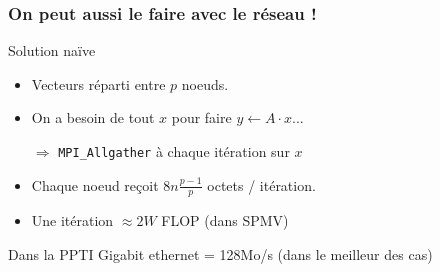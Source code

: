 \documentclass[xcolor={x11names,svgnames}, 14pt]{beamer}
\begin{document}
\begin{frame}
  \frametitle{On peut aussi le faire avec le réseau !}

  \begin{block}{Solution naïve}
    \begin{itemize}
    \item Vecteurs réparti entre $p$ noeuds.
    \item On a besoin de tout $x$ pour faire $y \gets A\cdot x$...
    \item[$\Rightarrow$] \texttt{MPI\_Allgather} à chaque itération sur $x$
    \item Chaque noeud reçoit $8n \frac{p-1}{p}$ octets / itération.
    \item Une itération $\approx 2W$ FLOP (dans SPMV)
    \end{itemize}
  \end{block}

  \begin{alertblock}{Dans la PPTI}
    Gigabit ethernet = 128Mo/s \small (dans le meilleur des cas)
  \end{alertblock}

  
\end{frame}

\end{document}
